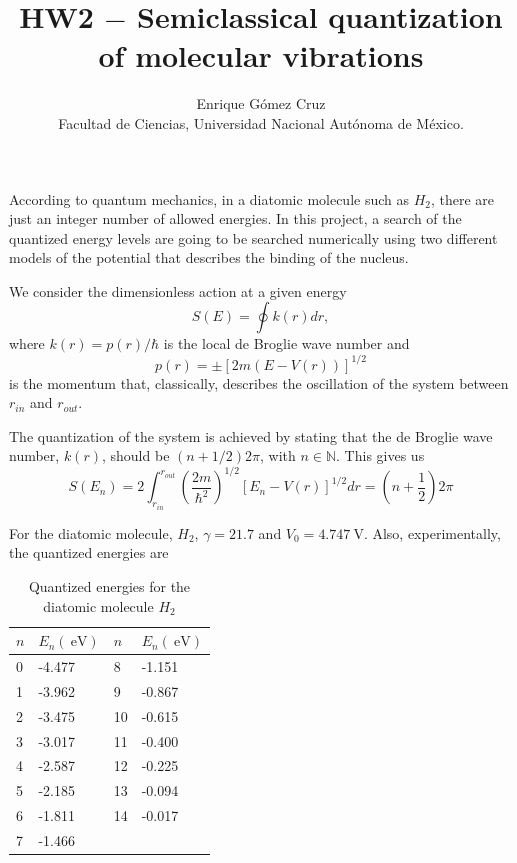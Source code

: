 \documentclass[11pt]{article}
\title{HW2 $-$ Semiclassical quantization of molecular vibrations}
\author{Enrique Gómez Cruz\\Facultad de Ciencias, Universidad Nacional Autónoma de México.}
\date{}
\begin{document}
\maketitle

  
According to quantum mechanics, in a diatomic molecule such as $H_2$, there are just an integer number of allowed energies. In this project, a search of the quantized energy levels are going to be searched numerically using two different models of the potential that describes the binding of the nucleus.

We consider the dimensionless action at a given energy
\begin{equation*}
  S(E) = \oint k(r) dr,
\end{equation*}
where $k(r) = p(r)/\hbar$ is the local de Broglie wave number and 
\begin{equation*}
 p(r) = \pm[2m(E-V(r))]^{1/2}
\end{equation*}
is the momentum that, classically, describes the oscillation of the system between $r_{in}$ and $r_{out}$.

The quantization of the system is achieved by stating that the de Broglie wave number, $k(r)$, should be $(n+1/2)2 \pi$, with $n\in\mathds{N}$. This gives us
\begin{equation}
  S(E_n) = 2\int_{r_{in}}^{r_{out}}\left(\frac{2m}{\hbar^2}\right)^{1/2} \left[E_n-V(r)\right]^{1/2} dr = \left(n+\frac{1}{2}\right) 2\pi
\label{eqn:action}
\end{equation}

For the diatomic molecule, $H_2$, $\gamma = 21.7$ and $V_0 = \SI{4.747}{\volt}$. Also, experimentally, the quantized energies are
\begin{table}[H]
\centering
\caption{Quantized energies for the diatomic molecule $H_2$}
\label{tbl:energy}
\begin{tabular}{ll|ll}
$n$ & $E_n(\SI{}{\electronvolt})$  & $n$ & $E_n(\SI{}{\electronvolt})$  \\\hline
0   & -4.477 & 8   & -1.151 \\
1   & -3.962 & 9   & -0.867 \\
2   & -3.475 & 10  & -0.615 \\
3   & -3.017 & 11  & -0.400 \\
4   & -2.587 & 12  & -0.225 \\
5   & -2.185 & 13  & -0.094 \\
6   & -1.811 & 14  & -0.017 \\
7   & -1.466 &     &       
\end{tabular}
\end{table}
\end{document}
